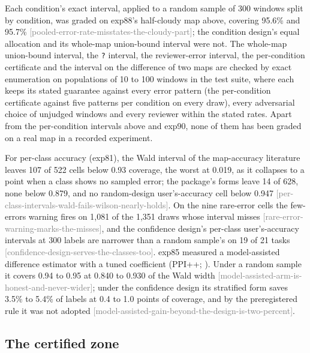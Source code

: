 \documentclass[11pt,a4paper]{article}
\newcommand{\claim}[1]{{\scriptsize\textsf{\textcolor{gray}{[#1]}}}}
\newcommand{\code}[1]{\texttt{#1}}
\begin{document}
Each condition's exact interval, applied to a random sample of 300 windows split by condition, was graded on exp88's
half-cloudy map above, covering 95.6\% and 95.7\% \claim{pooled-error-rate-misstates-the-cloudy-part}; the condition
design's equal allocation and its whole-map union-bound interval were not. The whole-map union-bound interval, the \code{?} interval,
the reviewer-error interval, the per-condition certificate and the interval on the difference of two maps are checked
by exact enumeration on populations of 10 to 100 windows in the test suite, where each keeps its stated guarantee against
every error pattern (the per-condition certificate against five patterns per condition on every draw), every
adversarial choice of unjudged windows and every reviewer within the stated rates. Apart from the per-condition
intervals above and exp90, none of them has been graded on a real map in a recorded experiment.

For per-class accuracy (exp81), the Wald interval of the map-accuracy literature leaves 107 of 522 cells below 0.93
coverage, the worst at 0.019, as it collapses to a point when a class shows no sampled error; the package's forms leave
14 of 628, none below 0.879, and no random-design user's-accuracy cell below 0.947
\claim{per-class-intervals-wald-fails-wilson-nearly-holds}. On the nine rare-error cells the few-errors warning fires
on 1,081 of the 1,351 draws whose interval misses \claim{rare-error-warning-marks-the-misses}, and the confidence design's per-class
user's-accuracy intervals at 300 labels are narrower than a random sample's on 19 of 21 tasks
\claim{confidence-design-serves-the-classes-too}.
exp85 measured a model-assisted difference estimator with a tuned coefficient (PPI++; \citealp{angelopoulos2023ppipp}). Under a random sample it covers 0.94 to 0.95 at 0.840 to 0.930 of the Wald width
\claim{model-assisted-arm-is-honest-and-never-wider}; under the confidence design its stratified form \citep{fisch2024} saves 3.5\% to 5.4\% of labels at 0.4 to 1.0 points of coverage, and by the preregistered rule it was not adopted
\claim{model-assisted-gain-beyond-the-design-is-two-percent}.

\subsection{The certified zone}
\label{sec:zone-results}
\end{document}
